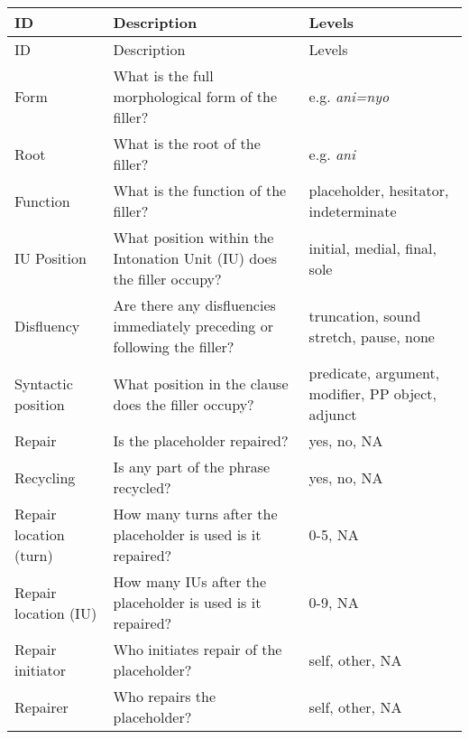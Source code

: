 \documentclass[output=paper,colorlinks,citecolor=brown
\ChapterDOI{10.5281/zenodo.15697585}
]{langscibook}
\begin{document}
\begin{xltabular}{1\textwidth}{p{} Q p{8em}}
  \lsptoprule   ID         & Description & Levels\\\midrule\endfirsthead
  \midrule      ID        & Description & Levels\\\midrule\endhead
  \endfoot\lspbottomrule\endlastfoot
  Form      & What is the full morphological form of the filler? & e.g. \textit{ani=nyo} \\
  Root      & What is the root of the filler? & e.g. \textit{ani}\\
  Function  & What is the function of the filler? & {placeholder, hesitator, indeterminate}\\
  IU Position  & What position within the Intonation Unit (IU) does the filler occupy? & initial, medial, final, sole\\
  Disfluency  & Are there any disfluencies immediately preceding or following the filler? & {truncation, sound stretch, pause, none}\\
  Syntactic position  & What position in the clause does the filler occupy? & predicate, argument, modifier, PP object, adjunct\\
  Repair  & Is the placeholder repaired? & {yes, no, NA}\\
  Recycling   & Is any part of the phrase recycled? & {yes, no, NA}\\
  Repair location (turn)  & How many turns after the placeholder is used is it repaired? & {0-5, NA}\\
  Repair location (IU)  & How many IUs after the placeholder is used is it repaired? & {0-9, NA}\\
  Repair initiator &  Who initiates repair of the placeholder? & {self, other, NA}\\
  Repairer &  Who repairs the placeholder? & {self, other, NA}\\
 \end{xltabular}
\end{document}
